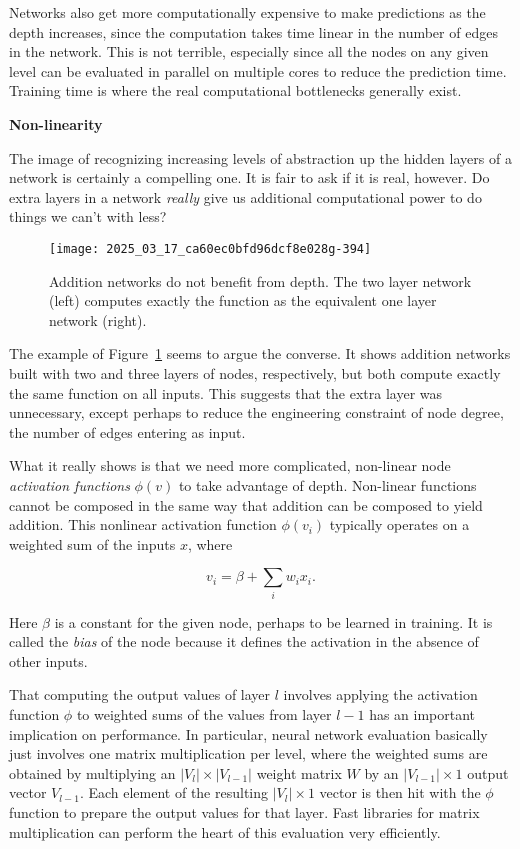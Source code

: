 \documentclass[10pt]{article}
\begin{document}
\begin{enumerate}
Networks also get more computationally expensive to make predictions as the depth increases, since the computation takes time linear in the number of edges in the network. This is not terrible, especially since all the nodes on any given level can be evaluated in parallel on multiple cores to reduce the prediction time. Training time is where the real computational bottlenecks generally exist.

\textbf{Non-linearity}

The image of recognizing increasing levels of abstraction up the hidden layers of a network is certainly a compelling one. It is fair to ask if it is real, however. Do extra layers in a network \textit{really} give us additional computational power to do things we can’t with less?

\begin{figure}[h]
\centering
\texttt{[image: 2025\_03\_17\_ca60ec0bfd96dcf8e028g-394]}
\caption{Addition networks do not benefit from depth. The two layer network (left) computes exactly the function as the equivalent one layer network (right).}
\label{fig:additionnetworks}
\end{figure}

The example of Figure~\ref{fig:additionnetworks} seems to argue the converse. It shows addition networks built with two and three layers of nodes, respectively, but both compute exactly the same function on all inputs. This suggests that the extra layer was unnecessary, except perhaps to reduce the engineering constraint of node degree, the number of edges entering as input.

What it really shows is that we need more complicated, non-linear node \textit{activation functions} $\phi(v)$ to take advantage of depth. Non-linear functions cannot be composed in the same way that addition can be composed to yield addition. This nonlinear activation function $\phi(v_{i})$ typically operates on a weighted sum of the inputs $x$, where

\[
v_{i} = \beta + \sum_{i} w_{i} x_{i}.
\]

Here $\beta$ is a constant for the given node, perhaps to be learned in training. It is called the \textit{bias} of the node because it defines the activation in the absence of other inputs.

That computing the output values of layer $l$ involves applying the activation function $\phi$ to weighted sums of the values from layer $l-1$ has an important implication on performance. In particular, neural network evaluation basically just involves one matrix multiplication per level, where the weighted sums are obtained by multiplying an $|V_{l}| \times |V_{l-1}|$ weight matrix $W$ by an $|V_{l-1}| \times 1$ output vector $V_{l-1}$. Each element of the resulting $|V_{l}| \times 1$ vector is then hit with the $\phi$ function to prepare the output values for that layer. Fast libraries for matrix multiplication can perform the heart of this evaluation very efficiently.


\end{enumerate}
\end{document}
